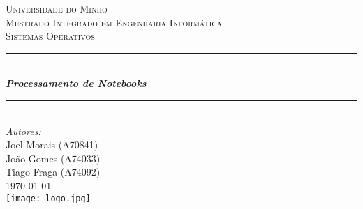 \documentclass{report}
\begin{document}
\begin{titlepage}

\newcommand{\HRule}{\rule{\linewidth}{0.5mm}} %

\center %
 

\textsc{\LARGE Universidade do Minho}\\[1.5cm] %
\textsc{\Large Mestrado Integrado em Engenharia Informática}\\[0.5cm] %
\textsc{\large Sistemas Operativos}\\[0.5cm] %


\HRule \\[0.4cm]
{\huge \bfseries \emph{Processamento de Notebooks}}\\[0.2cm] %
\HRule \\[1.5cm]
 

\Large \emph{Autores:}\\
Joel Morais (A70841) \\
João Gomes (A74033) \\
Tiago Fraga (A74092) \\[1cm]


{\large \today}\\[1cm] %
 


\texttt{[image: logo.jpg]} %

\vfill %

\end{titlepage}
 
\end{document}
